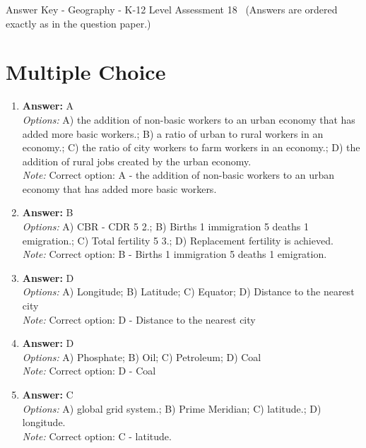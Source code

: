 \documentclass[12pt]{article}
\begin{document}
\begin{center}
Answer Key - Geography - K-12 Level Assessment 18 \
\small (Answers are ordered exactly as in the question paper.)
\end{center}

\section*{Multiple Choice}
\begin{enumerate}[label=\arabic*.]
\item \textbf{Answer:} A
\\ \textit{Options:} A) the addition of non-basic workers to an urban economy that has added more basic workers.; B) a ratio of urban to rural workers in an economy.; C) the ratio of city workers to farm workers in an economy.; D) the addition of rural jobs created by the urban economy.
\\ \textit{Note:} Correct option: A - the addition of non-basic workers to an urban economy that has added more basic workers.
\item \textbf{Answer:} B
\\ \textit{Options:} A) CBR - CDR 5 2.; B) Births 1 immigration 5 deaths 1 emigration.; C) Total fertility 5 3.; D) Replacement fertility is achieved.
\\ \textit{Note:} Correct option: B - Births 1 immigration 5 deaths 1 emigration.
\item \textbf{Answer:} D
\\ \textit{Options:} A) Longitude; B) Latitude; C) Equator; D) Distance to the nearest city
\\ \textit{Note:} Correct option: D - Distance to the nearest city
\item \textbf{Answer:} D
\\ \textit{Options:} A) Phosphate; B) Oil; C) Petroleum; D) Coal
\\ \textit{Note:} Correct option: D - Coal
\item \textbf{Answer:} C
\\ \textit{Options:} A) global grid system.; B) Prime Meridian; C) latitude.; D) longitude.
\\ \textit{Note:} Correct option: C - latitude.
\end{enumerate}
\end{document}

